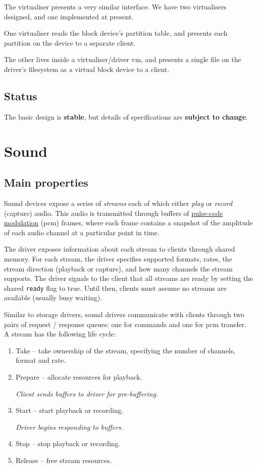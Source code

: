 \documentclass[a4paper,12pt]{report}
\newcommand{\code}[1]{\texttt{#1}}
\begin{document}
The virtualiser presents a very similar interface.  We have two
virtualisers designed, and one implemented at present.

One virtualiser reads the block device's partition table, and presents
each partition on the device to a separate client.

The other lives inside a virtualiser/driver \gls{vm}, and presents a single
file on the driver's filesystem as a virtual block device to a client.

\subsection{Status}

The basic design is \textbf{stable}, but details of specifications are
\textbf{subject to change}.

\section{Sound}

\subsection{Main properties}

Sound devices expose a series of \textit{streams} each of which either
\textit{play} or \textit{record} (capture) audio. This audio is transmitted
through buffers of
\href{https://en.wikipedia.org/wiki/Pulse-code_modulation}{pulse-code
  modulation} (\gls{pcm}) frames, where
each frame contains a snapshot of the amplitude of each audio channel at a
particular point in time.

The driver exposes information about each stream to clients through shared
memory. For each stream, the driver specifies supported formats, rates, the
stream direction (playback or capture), and how many channels the stream
supports. The driver signals to the client that all streams are ready by setting
the shared \code{ready} flag to true. Until then, clients must assume no
streams are available (usually busy waiting).

Similar to storage drivers, sound drivers communicate with clients through two
pairs of request / response queues: one for commands and one for \gls{pcm} transfer.
A stream has the following life cycle:
\begin{enumerate}
  \item Take -- take ownership of the stream, specifying the number of channels, format and rate.
  \item Prepare -- allocate resources for playback.

  \textit{Client sends buffers to driver for pre-buffering.}

  \item Start -- start playback or recording.

  \textit{Driver begins responding to buffers.}

  \item Stop -- stop playback or recording.
  \item Release -- free stream resources.
\end{enumerate}
\end{document}
